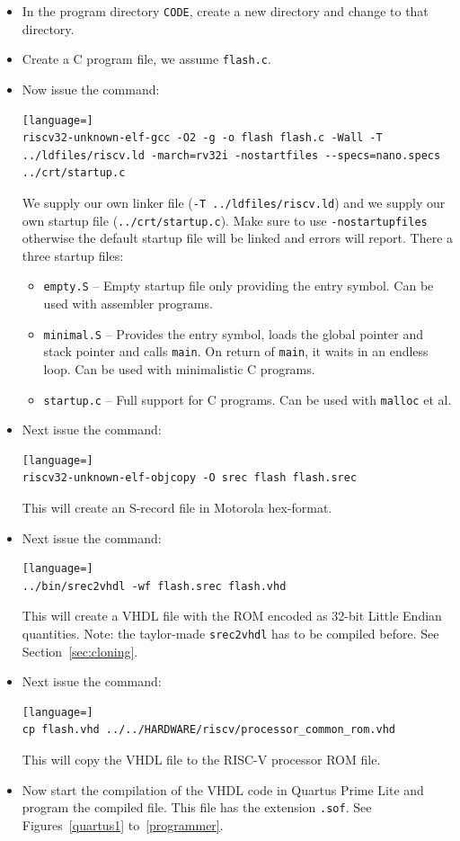 \documentclass[12pt]{article}
\begin{document}
\begin{itemize}
\item In the program directory \lstinline|CODE|, create a new directory and change to that directory.
\item Create a C program file, we assume \lstinline|flash.c|.
\item Now issue the command:
\begin{lstlisting}[language=]
riscv32-unknown-elf-gcc -O2 -g -o flash flash.c -Wall -T ../ldfiles/riscv.ld -march=rv32i -nostartfiles --specs=nano.specs ../crt/startup.c
\end{lstlisting}
We supply our own linker file (\lstinline|-T ../ldfiles/riscv.ld|) and we supply our own startup file (\lstinline|../crt/startup.c|). Make sure to use \lstinline|-nostartupfiles| otherwise the default startup file will be linked and errors will report. There a three startup files:
\begin{itemize}
\item \texttt{empty.S} -- Empty startup file only providing the entry symbol. Can be used with assembler programs.
\item \texttt{minimal.S} -- Provides the entry symbol, loads the global pointer and stack pointer and calls \texttt{main}. On return of \texttt{main}, it waits in an endless loop. Can be used with minimalistic C programs.
\item \texttt{startup.c} -- Full support for C programs. Can be used with \texttt{malloc} et al.
\end{itemize}
\item Next issue the command:
\begin{lstlisting}[language=]
riscv32-unknown-elf-objcopy -O srec flash flash.srec
\end{lstlisting}
This will create an S-record file in Motorola hex-format.
\item Next issue the command:
\begin{lstlisting}[language=]
../bin/srec2vhdl -wf flash.srec flash.vhd
\end{lstlisting}
This will create a VHDL file with the ROM encoded as 32-bit Little Endian quantities. Note: the taylor-made \texttt{srec2vhdl} has to be compiled before. See Section~\ref{sec:cloning}.
\item Next issue the command:
\begin{lstlisting}[language=]
cp flash.vhd ../../HARDWARE/riscv/processor_common_rom.vhd
\end{lstlisting}
This will copy the VHDL file to the RISC-V processor ROM file.
\item Now start the compilation of the VHDL code in Quartus Prime Lite and program the compiled file. This file has the extension \lstinline|.sof|. See Figures~\ref{quartus1} to~\ref{programmer}.


\end{itemize}
\end{document}
